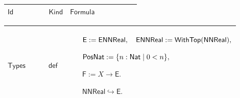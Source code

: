 \documentclass[12pt,reqno]{amsart}
\theoremstyle{blueplain}
\numberwithin{equation}{section}
\newlength{\DCTOneColumnBody}
\begin{document}
{\scriptsize \setlength{\parskip}{0pt}\nointerlineskip
\noindent 
\begin{tabular}{|@{}>{\centering\arraybackslash}m{\DCTOneColumnBody}|}
\hline
$\displaystyle \mathsf{Context\_0}:=$\par$\displaystyle X:\mathsf{Type}%
,\quad A:\mathsf{Set}(\mathsf{Set}(X)),$\par$\displaystyle \mu:\mathsf{Set}%
(X)\to\mathsf{ENNReal},\quad\mathsf{MS}(A,\mu).$ \\ \hline
\end{tabular}%
}

\subsection{\protect\scriptsize Definitions}

{\scriptsize {\ }}

{\scriptsize \setlength{\parskip}{0pt}\nointerlineskip
\noindent 
\begin{tabular}{|@{}>{\centering\arraybackslash}m{\DCTOneColumnBody}|}
\hline
$\displaystyle \mathsf{Definitions}$ \\ \hline
\end{tabular}%
}

{\scriptsize \setlength{\parskip}{0pt}\nointerlineskip
\noindent 
\begin{tabular}{|@{}>{\centering\arraybackslash}m{0.19251\linewidth}|>{\centering\arraybackslash}m{0.16845\linewidth}|>{\centering\arraybackslash}m{0.53904\linewidth}|}
\hline
$\displaystyle \mathsf{Id}$ & $\displaystyle \mathsf{Kind}$ & $\displaystyle 
\mathsf{Formula}$ \\ \hline
\end{tabular}%
}

{\scriptsize \setlength{\parskip}{0pt}\nointerlineskip
\noindent 
\begin{tabular}{|@{}>{\centering\arraybackslash}m{0.19251\linewidth}|>{\centering\arraybackslash}m{0.16845\linewidth}|>{\centering\arraybackslash}m{0.53904\linewidth}|}
\hline
\hypertarget{def:Types}{$\displaystyle \mathsf{Types}$} & $\displaystyle 
\mathsf{def}$ & $\displaystyle \mathsf{E}:=\mathsf{ENNReal},\quad\mathsf{%
ENNReal}:=\mathsf{WithTop}(\mathsf{NNReal}),$\par$\displaystyle \mathsf{%
PosNat}:=\{n:\mathsf{Nat}\mid 0<n\},$\par$\displaystyle \mathsf{F}:=X\to%
\mathsf{E}.$\par$\displaystyle \mathsf{NNReal}\hookrightarrow\mathsf{E}.$ \\ 
\hline
\end{tabular}%
}
\end{document}

